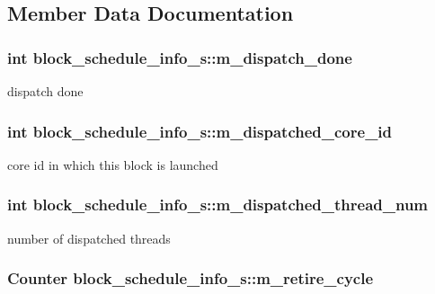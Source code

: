 \subsection{Member Data Documentation}
\hypertarget{structblock__schedule__info__s_a78744ab215866834ea3fd99a78e6758f}{
\subsubsection[{m\_\-dispatch\_\-done}]{\setlength{\rightskip}{0pt plus 5cm}int {\bf block\_\-schedule\_\-info\_\-s::m\_\-dispatch\_\-done}}}
\label{structblock__schedule__info__s_a78744ab215866834ea3fd99a78e6758f}
dispatch done \hypertarget{structblock__schedule__info__s_af9ed930b90d0ca42f0311528a8186f39}{
\subsubsection[{m\_\-dispatched\_\-core\_\-id}]{\setlength{\rightskip}{0pt plus 5cm}int {\bf block\_\-schedule\_\-info\_\-s::m\_\-dispatched\_\-core\_\-id}}}
\label{structblock__schedule__info__s_af9ed930b90d0ca42f0311528a8186f39}
core id in which this block is launched \hypertarget{structblock__schedule__info__s_af3b66bd84d411c90fe2683bf77394683}{
\subsubsection[{m\_\-dispatched\_\-thread\_\-num}]{\setlength{\rightskip}{0pt plus 5cm}int {\bf block\_\-schedule\_\-info\_\-s::m\_\-dispatched\_\-thread\_\-num}}}
\label{structblock__schedule__info__s_af3b66bd84d411c90fe2683bf77394683}
number of dispatched threads \hypertarget{structblock__schedule__info__s_ac2d0055e1b2764b0c54c92ee51094e8e}{
\subsubsection[{m\_\-retire\_\-cycle}]{\setlength{\rightskip}{0pt plus 5cm}Counter {\bf block\_\-schedule\_\-info\_\-s::m\_\-retire\_\-cycle}}}

